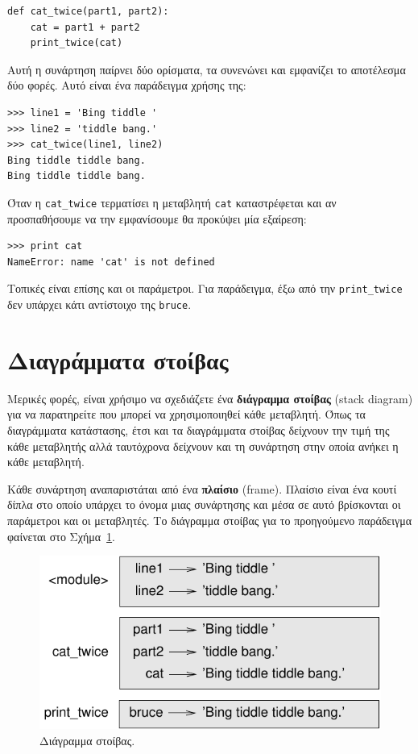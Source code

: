 \documentclass[10pt]{book}
\begin{document}
\begin{verbatim}
def cat_twice(part1, part2):
    cat = part1 + part2
    print_twice(cat)
\end{verbatim}
%

Αυτή η συνάρτηση παίρνει δύο ορίσματα, τα συνενώνει και εμφανίζει το
αποτέλεσμα δύο φορές. Αυτό είναι ένα παράδειγμα χρήσης της:

\begin{verbatim}
>>> line1 = 'Bing tiddle '
>>> line2 = 'tiddle bang.'
>>> cat_twice(line1, line2)
Bing tiddle tiddle bang.
Bing tiddle tiddle bang.
\end{verbatim}
%

Όταν η \verb"cat_twice" τερματίσει η μεταβλητή {\tt cat}
καταστρέφεται και αν προσπαθήσουμε να την εμφανίσουμε θα προκύψει 
μία εξαίρεση:

\begin{verbatim}
>>> print cat
NameError: name 'cat' is not defined
\end{verbatim}
%

Τοπικές είναι επίσης και οι παράμετροι. Για παράδειγμα, έξω από την  \verb"print_twice" δεν υπάρχει κάτι αντίστοιχο της {\tt bruce}.


\section{Διαγράμματα στοίβας}
\label{stackdiagram}

Μερικές φορές, είναι χρήσιμο να σχεδιάζετε ένα {\bf διάγραμμα στοίβας} (stack diagram) για να παρατηρείτε που μπορεί να χρησιμοποιηθεί κάθε μεταβλητή. Όπως τα διαγράμματα κατάστασης, έτσι και τα διαγράμματα στοίβας δείχνουν την τιμή της κάθε μεταβλητής αλλά ταυτόχρονα δείχνουν και τη συνάρτηση στην οποία ανήκει η κάθε μεταβλητή.

Κάθε συνάρτηση αναπαριστάται από ένα {\bf πλαίσιο} (frame). Πλαίσιο είναι ένα κουτί δίπλα στο οποίο υπάρχει το όνομα μιας συνάρτησης και μέσα σε αυτό βρίσκονται οι παράμετροι και οι μεταβλητές. Το διάγραμμα στοίβας για το
προηγούμενο παράδειγμα φαίνεται στο Σχήμα~\ref{fig.stack}.


\begin{figure}
\centerline
{\includegraphics[scale=0.8]{figs/stack.pdf}}
\caption{Διάγραμμα στοίβας.}
\label{fig.stack}
\end{figure}
\end{document}
